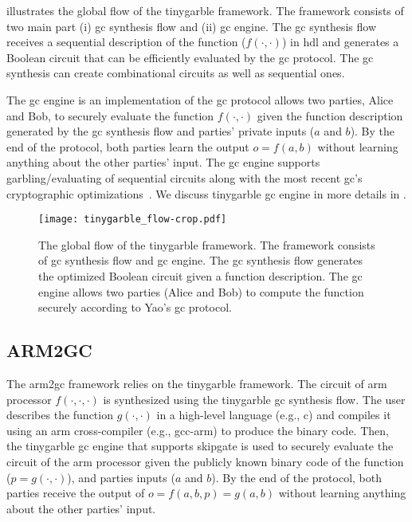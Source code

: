  illustrates the global flow of the \gls{tinygarble} framework.
The framework consists of two main part (i) \acrshort{gc} synthesis flow and (ii) \acrshort{gc} engine.
The \acrshort{gc} synthesis flow receives a sequential description of the function ($f(\cdot, \cdot)$) in \acrshort{hdl} and generates a Boolean circuit that can be efficiently evaluated by the \acrshort{gc} protocol.
The \acrshort{gc} synthesis can create combinational circuits as well as sequential ones.

The \acrshort{gc} engine is an implementation of the \acrshort{gc} protocol allows two parties, Alice and Bob, to securely evaluate the function $f(\cdot,\cdot)$ given the function description generated by the \acrshort{gc} synthesis flow and parties' private inputs ($a$ and $b$).
By the end of the protocol, both parties learn the output $o = f(a, b)$ without learning anything about the other parties' input.
The \acrshort{gc} engine supports garbling/evaluating of sequential circuits along with the most recent \acrshort{gc}'s cryptographic optimizations~\cite{kolesnikov2008improved, bellare2013efficient, zahur2015two}.
We discuss \gls{tinygarble} \acrshort{gc} engine in more details in .

\begin{figure}
\centering
\texttt{[image: tinygarble\_flow-crop.pdf]}
\caption{The global flow of the \gls{tinygarble} framework.
The framework consists of \acrshort{gc} synthesis flow and \acrshort{gc} engine.
The \acrshort{gc} synthesis flow generates the optimized Boolean circuit given a function description.
The \acrshort{gc} engine allows two parties (Alice and Bob) to compute the function securely according to Yao's \acrshort{gc} protocol.
}
\label{fig:tinygarbel-global-flow}
\end{figure}

\subsection{ARM2GC}
The \gls{arm2gc} framework relies on the \gls{tinygarble} framework.
The circuit of \gls{arm} processor $f(\cdot,\cdot,\cdot)$ is synthesized using the \gls{tinygarble} \acrshort{gc} synthesis flow.
The user describes the function $g(\cdot,\cdot)$ in a high-level language (e.g., \gls{c}) and compiles it using an \gls{arm} cross-compiler (e.g., gcc-arm) to produce the binary code.
Then, the \gls{tinygarble} \acrshort{gc} engine that supports \gls{skipgate} is used to securely evaluate the circuit of the \gls{arm} processor given the publicly known binary code of the function ($p=g(\cdot,\cdot)$), and parties inputs ($a$ and $b$).
By the end of the protocol, both parties receive the output of $o = f(a,b,p) = g(a,b)$ without learning anything about the other parties' input.

